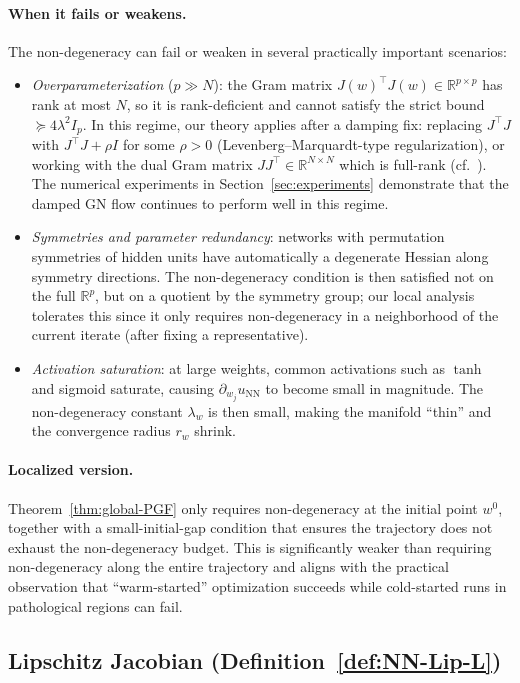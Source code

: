\documentclass[twoside,11pt]{article}
\newcommand{\R}{\mathbb{R}}
\newcommand{\NN}{\mathrm{NN}}
\begin{document}
\paragraph{When it fails or weakens.}
The non-degeneracy can fail or weaken in several practically important scenarios:
\begin{itemize}
\item \emph{Overparameterization} ($p\gg N$): the Gram matrix
$J(w)^\top J(w)\in\R^{p\times p}$ has rank at most $N$, so it is rank-deficient and
cannot satisfy the strict bound $\succeq 4\lambda^2 I_p$. In this regime, our theory
applies after a damping fix: replacing $J^\top J$ with $J^\top J + \rho I$ for some $\rho>0$
(Levenberg--Marquardt-type regularization), or working with the dual Gram matrix
$JJ^\top\in\R^{N\times N}$ which is full-rank (cf.\ \citet{cai2019gram}).
The numerical experiments in Section~\ref{sec:experiments} demonstrate that the damped
GN flow continues to perform well in this regime.
\item \emph{Symmetries and parameter redundancy}: networks with permutation symmetries of
hidden units have automatically a degenerate Hessian along symmetry directions. The
non-degeneracy condition is then satisfied not on the full $\R^p$, but on a quotient by
the symmetry group; our local analysis tolerates this since it only requires non-degeneracy
in a neighborhood of the current iterate (after fixing a representative).
\item \emph{Activation saturation}: at large weights, common activations such as $\tanh$
and sigmoid saturate, causing $\partial_{w_j} u_\NN$ to become small in magnitude.
The non-degeneracy constant $\lambda_w$ is then small, making the manifold ``thin''
and the convergence radius $r_w$ shrink.
\end{itemize}

\paragraph{Localized version.}
Theorem~\ref{thm:global-PGF} only requires non-degeneracy at the initial point $w^0$,
together with a small-initial-gap condition that ensures the trajectory does not exhaust
the non-degeneracy budget. This is significantly weaker than requiring non-degeneracy along
the entire trajectory and aligns with the practical observation that ``warm-started''
optimization succeeds while cold-started runs in pathological regions can fail.

\subsection{Lipschitz Jacobian (Definition~\ref{def:NN-Lip-L})}\label{app:disc-lip-jacobian}
\label{app:disc-lipjac}
\end{document}
